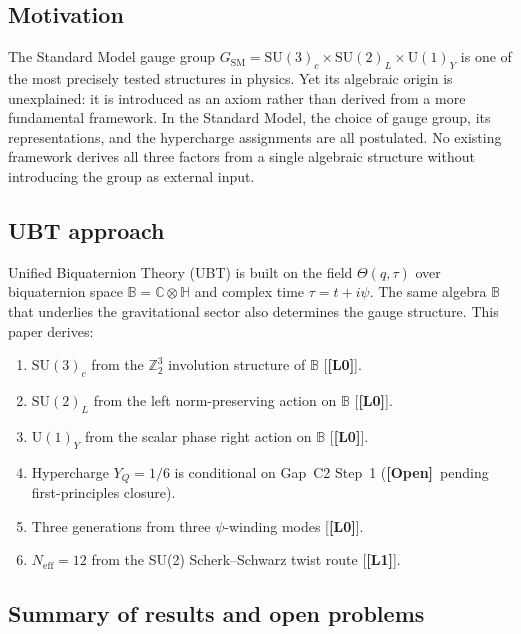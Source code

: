 \documentclass[12pt,a4paper]{article}
\theoremstyle{definition}
\theoremstyle{remark}
\newcommand{\OPEN}{\textbf{[Open]}}
\newcommand{\SU}[1]{\mathrm{SU}(#1)}
\newcommand{\UU}[1]{\mathrm{U}(#1)}
\newcommand{\Bq}{\mathbb{C}\otimes\mathbb{H}}
\newcommand{\Lone}{\textbf{[L1]}}
\newcommand{\Lzero}{\textbf{[L0]}}
\begin{document}
\subsection{Motivation}

The Standard Model gauge group
$G_{\mathrm{SM}} = \SU{3}_c\times\SU{2}_L\times\UU{1}_Y$
is one of the most precisely tested structures in physics.
Yet its algebraic origin is unexplained: it is introduced as an axiom
rather than derived from a more fundamental framework.
In the Standard Model, the choice of gauge group, its representations,
and the hypercharge assignments are all postulated.
No existing framework derives all three factors from a single algebraic
structure without introducing the group as external input.

\subsection{UBT approach}

Unified Biquaternion Theory (UBT) \cite{jaros2026gr} is built on the field
$\Theta(q,\tau)$ over biquaternion space $\mathbb{B} = \Bq$
and complex time $\tau = t + i\psi$.
The same algebra $\mathbb{B}$ that underlies the gravitational sector
also determines the gauge structure.
This paper derives:
\begin{enumerate}
\item $\SU{3}_c$ from the $\mathbb{Z}_2^3$ involution structure of $\mathbb{B}$ [\Lzero].
\item $\SU{2}_L$ from the left norm-preserving action on $\mathbb{B}$ [\Lzero].
\item $\UU{1}_Y$ from the scalar phase right action on $\mathbb{B}$ [\Lzero].
\item Hypercharge $Y_Q = 1/6$ is conditional on Gap~C2 Step~1
      (\OPEN\ pending first-principles closure).
\item Three generations from three $\psi$-winding modes [\Lzero].
\item $N_{\mathrm{eff}} = 12$ from the SU(2) Scherk--Schwarz twist route [\Lone].
\end{enumerate}

\subsection{Summary of results and open problems}
\end{document}
